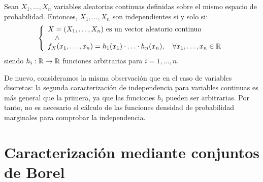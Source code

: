 \begin{prop}
    Sean $X_1, \ldots, X_n$ variables aleatorias continuas definidas sobre el mismo espacio de probabilidad. Entonces, $X_1, \ldots, X_n$ son independientes si y solo si:
    \[
        \left\{
            \begin{array}{l}
                X=(X_1, \ldots, X_n) \text{ es un vector aleatorio continuo} \\
                \quad \land \\
                f_X(x_1, \ldots, x_n) = h_1(x_1) \cdot \ldots \cdot h_n(x_n), \quad \forall x_1, \ldots, x_n \in \mathbb{R}
            \end{array}
        \right.
    \]
    siendo $h_i: \mathbb{R} \to \mathbb{R}$ funciones arbitrarias para $i = 1, \ldots, n$.
\end{prop}

\begin{observacion}
    De nuevo, consideramos la misma observación que en el caso de variables discretas: la segunda caracterización de independencia para variables continuas es más general que la primera, ya que las funciones $h_i$ pueden ser arbitrarias. Por tanto, no es necesario el cálculo de las funciones densidad de probabilidad marginales para comprobar la independencia.
\end{observacion}


\section{Caracterización mediante conjuntos de Borel}

